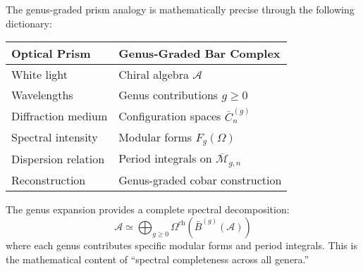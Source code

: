 \begin{remark}
The genus-graded prism analogy is mathematically precise through the following dictionary:
\begin{center}
\begin{tabular}{|l|l|}
\hline
\textbf{Optical Prism} & \textbf{Genus-Graded Bar Complex} \\
\hline
White light & Chiral algebra $\mathcal{A}$ \\
Wavelengths & Genus contributions $g \geq 0$ \\
Diffraction medium & Configuration spaces $\overline{C}_n^{(g)}$ \\
Spectral intensity & Modular forms $F_g(\Omega)$ \\
Dispersion relation & Period integrals on $\overline{\mathcal{M}}_{g,n}$ \\
Reconstruction & Genus-graded cobar construction \\
\hline
\end{tabular}
\end{center}

The genus expansion provides a complete spectral decomposition:
$$\mathcal{A} \simeq \bigoplus_{g \geq 0} \Omega^{\text{ch}}(\bar{B}^{(g)}(\mathcal{A}))$$
where each genus contributes specific modular forms and period integrals.
This is the mathematical content of ``spectral completeness across all genera.''
\end{remark}




